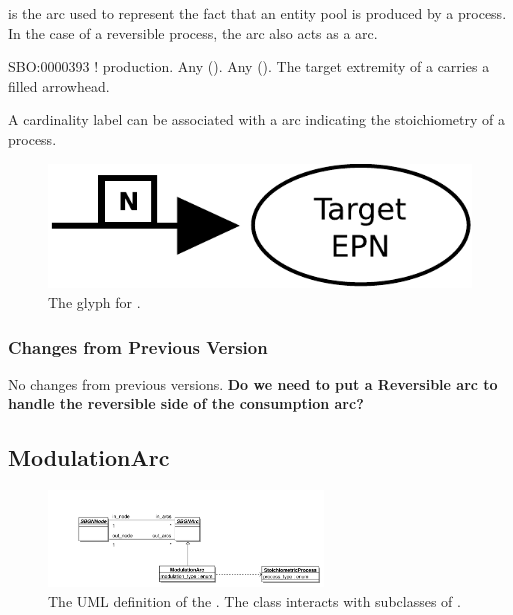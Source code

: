  is the arc used to represent the fact that an entity pool is 
produced by a process. In the case of a reversible process, the 
 arc also acts as a  arc.

\begin{glyphDescription}
 \glyphSboTerm SBO:0000393 ! production.
 \glyphOrigin Any  ().
 \glyphTarget Any  ().
 \glyphEndPoint The target extremity of a  carries a filled arrowhead.
 \end{glyphDescription}

A cardinality label can be associated with a  arc indicating the stoichiometry of a process.

\begin{figure}[H]
  \centering
  \includegraphics[scale = 0.4]{images/production}
  \caption{The \PD glyph for .}
  \label{fig:production}
\end{figure}


\subsubsection{Changes from Previous Version}

No changes from previous versions. \textbf{Do we need to put a
  Reversible arc to handle the reversible side of the consumption arc?}

\subsection{ModulationArc}
\label{defn:ModulationArc}

\begin{figure}[htb]
  \centering
  \includegraphics[width = 0.65\textwidth]{images/modulationarcuml}
  \caption{The UML definition of the . The class interacts with
    subclasses of .}
  \label{fig:modulationarcuml}
\end{figure}
 
